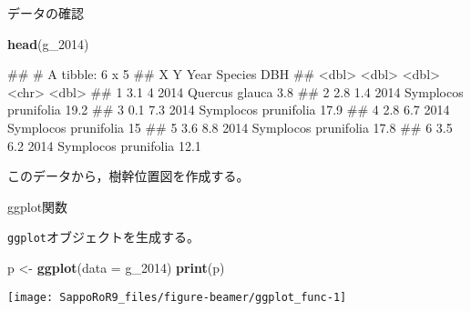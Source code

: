 \documentclass[ignorenonframetext,]{beamer}
\newenvironment{Shaded}{\begin{snugshade}}{\end{snugshade}}
\newcommand{\KeywordTok}[1]{\textcolor[rgb]{0.13,0.29,0.53}{\textbf{#1}}}
\newcommand{\DataTypeTok}[1]{\textcolor[rgb]{0.13,0.29,0.53}{#1}}
\newcommand{\DecValTok}[1]{\textcolor[rgb]{0.00,0.00,0.81}{#1}}
\newcommand{\StringTok}[1]{\textcolor[rgb]{0.31,0.60,0.02}{#1}}
\newcommand{\NormalTok}[1]{#1}
\let\oldShaded\Shaded
\let\endoldShaded\endShaded
\renewenvironment{Shaded}{\footnotesize\oldShaded}{\endoldShaded}
\let\oldverbatim\verbatim
\let\endoldverbatim\endverbatim
\renewenvironment{verbatim}{\footnotesize\oldverbatim}{\endoldverbatim}
\begin{document}
\begin{frame}[fragile]{データの確認}

\begin{Shaded}
\begin{Highlighting}[]
\KeywordTok{head}\NormalTok{(g_}\DecValTok{2014}\NormalTok{)}
\end{Highlighting}
\end{Shaded}

\begin{verbatim}
## # A tibble: 6 x 5
##       X     Y  Year Species                DBH
##   <dbl> <dbl> <dbl> <chr>                <dbl>
## 1   3.1   4    2014 Quercus glauca         3.8
## 2   2.8   1.4  2014 Symplocos prunifolia  19.2
## 3   0.1   7.3  2014 Symplocos prunifolia  17.9
## 4   2.8   6.7  2014 Symplocos prunifolia  15  
## 5   3.6   8.8  2014 Symplocos prunifolia  17.8
## 6   3.5   6.2  2014 Symplocos prunifolia  12.1
\end{verbatim}

このデータから，樹幹位置図を作成する。

\end{frame}

\begin{frame}[fragile]{ggplot関数}

\texttt{ggplot}オブジェクトを生成する。

\begin{Shaded}
\begin{Highlighting}[]
\NormalTok{p <-}\StringTok{ }\KeywordTok{ggplot}\NormalTok{(}\DataTypeTok{data =}\NormalTok{ g_}\DecValTok{2014}\NormalTok{)}
\KeywordTok{print}\NormalTok{(p)}
\end{Highlighting}
\end{Shaded}

\texttt{[image: SappoRoR9\_files/figure-beamer/ggplot\_func-1]}

\end{frame}
\end{document}
